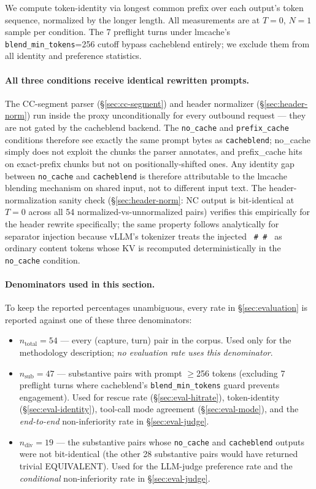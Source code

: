 We compute token-identity via longest common prefix over each output's
token sequence, normalized by the longer length. All measurements are
at $T=0$, $N{=}1$ sample per condition. The 7 preflight turns under
lmcache's \texttt{blend\_min\_tokens}=256 cutoff bypass cacheblend
entirely; we exclude them from all identity and preference statistics.

\paragraph{All three conditions receive identical rewritten prompts.}
The CC-segment parser (\S\ref{sec:cc-segment}) and header normalizer
(\S\ref{sec:header-norm}) run inside the proxy unconditionally for
every outbound request --- they are not gated by the cacheblend
backend. The \texttt{no\_cache} and \texttt{prefix\_cache} conditions
therefore see exactly the same prompt bytes as \texttt{cacheblend};
no\_cache simply does not exploit the chunks the parser annotates,
and prefix\_cache hits on exact-prefix chunks but not on
positionally-shifted ones. Any identity gap between
\texttt{no\_cache} and \texttt{cacheblend} is therefore attributable
to the lmcache blending mechanism on shared input, not to different
input text. The header-normalization sanity check
(\S\ref{sec:header-norm}: NC output is bit-identical at $T{=}0$
across all 54 normalized-vs-unnormalized pairs) verifies this
empirically for the header rewrite specifically; the same property
follows analytically for separator injection because vLLM's
tokenizer treats the injected \texttt{\textquotedbl{}~\#~\#~\textquotedbl{}}
as ordinary content tokens whose KV is recomputed deterministically
in the \texttt{no\_cache} condition.

\paragraph{Denominators used in this section.} To keep the reported
percentages unambiguous, every rate in \S\ref{sec:evaluation} is
reported against one of these three denominators:

\begin{itemize}
\item $n_{\text{total}}{=}54$ — every (capture, turn) pair in the
  corpus. Used only for the methodology description; \emph{no
  evaluation rate uses this denominator}.
\item $n_{\text{sub}}{=}47$ — substantive pairs with prompt $\geq$256
  tokens (excluding 7 preflight turns where cacheblend's
  \texttt{blend\_min\_tokens} guard prevents engagement). Used for
  rescue rate (\S\ref{sec:eval-hitrate}), token-identity
  (\S\ref{sec:eval-identity}), tool-call mode agreement
  (\S\ref{sec:eval-mode}), and the \emph{end-to-end} non-inferiority
  rate in \S\ref{sec:eval-judge}.
\item $n_{\text{div}}{=}19$ — the substantive pairs whose
  \texttt{no\_cache} and \texttt{cacheblend} outputs were not
  bit-identical (the other 28 substantive pairs would have returned
  trivial EQUIVALENT). Used for the LLM-judge preference rate and the
  \emph{conditional} non-inferiority rate in \S\ref{sec:eval-judge}.
\end{itemize}

